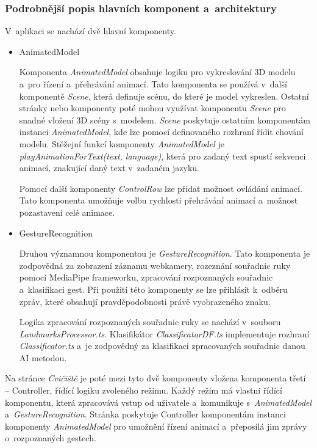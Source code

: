 \documentclass[
  master,
  program=ainfvs,
  biblatex,
  figures=true,
  tables=false,
  sourcecodes=true,
  glossaries,
  index
]{kidiplom}
\begin{document}
        \subsubsection{Podrobnější popis hlavních komponent a~architektury}
            V~aplikaci se nachází dvě hlavní komponenty. 
            \begin{itemize}
                \item AnimatedModel \par
                    Komponenta \emph{AnimatedModel} obsahuje logiku pro vykreslování 3D modelu a~pro řízení a~přehrávání animací. Tato komponenta se používá v~další komponentě \emph{Scene}, která definuje scénu, do které je model vykreslen. Ostatní stránky nebo komponenty poté mohou využívat komponentu \emph{Scene} pro snadné vložení 3D scény s~modelem. \emph{Scene} poskytuje ostatním komponentám instanci \emph{AnimatedModel}, kde lze pomocí definovaného rozhraní řídit chování modelu. Stěžejní funkcí komponenty \emph{AnimatedModel} je \emph{playAnimationForText(text, language)}, která pro zadaný text spustí sekvenci animací, znakující daný text v~zadaném jazyku.
    
                    Pomocí další komponenty \emph{ControlRow} lze přidat možnost ovládání animací. Tato komponenta umožňuje volbu rychlosti přehrávání animací a~možnost pozastavení celé animace.
    
                \item GestureRecognition \par
                    Druhou významnou komponentou je \emph{GestureRecognition}. Tato komponenta je zodpovědná za zobrazení záznamu webkamery, rozeznání souřadnic ruky pomocí MediaPipe frameworku, zpracování rozpoznaných souřadnic a~klasifikaci gest. Při použití této komponenty se lze přihlásit k~odběru zpráv, které obsahují pravděpodobnosti právě vyobrazeného znaku.

                    Logika zpracování rozpoznaných souřadnic ruky se nachází v~souboru \emph{LandmarksProcessor.ts}. Klasifikátor \emph{ClassificatorDF.ts} implementuje rozhraní \emph{Classificator.ts} a~je zodpovědný za klasifikaci zpracovaných souřadnic danou AI metodou.
            \end{itemize}

        Na stránce \emph{Cvičiště} je poté mezi tyto dvě komponenty vložena komponenta třetí -- Controller, řídící logiku zvoleného režimu. Každý režim má vlastní řídící komponentu, která zpracovává vstup od uživatele a~komunikuje s~\emph{AnimatedModel} a~\emph{GestureRecognition}. Stránka poskytuje Controller komponentám instanci komponenty \emph{AnimatedModel} pro umožnění řízení animací a~přeposílá jim zprávy o~rozpoznaných gestech.
\end{document}
